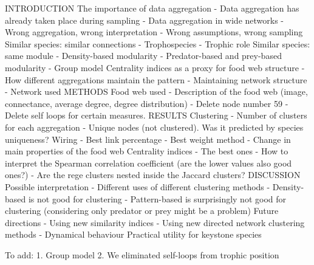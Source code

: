 INTRODUCTION
    The importance of data aggregation
        - Data aggregation has already taken place during sampling
        - Data aggregation in wide networks
        - Wrong aggregation, wrong interpretation
        - Wrong assumptions, wrong sampling
    Similar species: similar connections
        - Trophospecies
        - Trophic role 
    Similar species: same module 
        - Density-based modularity
        - Predator-based and prey-based modularity 
        - Group model 
    Centrality indices as a proxy for food web structure
        - How different aggregations maintain the pattern
        - Maintaining network structure
        - Network used
METHODS
    Food web used
        - Description of the food web (image, connectance, average degree, degree distribution)
        - Delete node number 59
        - Delete self loops for certain measures. 
RESULTS
    Clustering
        - Number of clusters for each aggregation
        - Unique nodes (not clustered). Was it predicted by species uniqueness? 
    Wiring
        - Best link percentage
        - Best weight method
        - Change in main properties of the food web
    Centrality indices
        - The best ones
        - How to interpret the Spearman correlation coefficient (are the lower values also good ones?)
        - Are the rege clusters nested inside the Jaccard clusters? 
DISCUSSION
    Possible interpretation
        - Different uses of different clustering methods 
        - Density-based is not good for clustering
        - Pattern-based is surprisingly not good for clustering (considering only predator or prey might be a problem)
    Future directions
        - Using new similarity indices
        - Using new directed network clustering methods
        - Dynamical behaviour 
    Practical utility for keystone species
    

To add:
1. Group model 
2. We eliminated self-loops from trophic position 